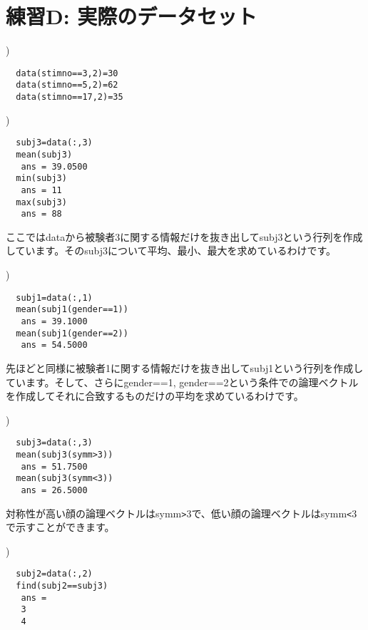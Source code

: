 \documentclass{jsarticle}
\begin{document}
\section{練習D: 実際のデータセット}

)

\begin{verbatim}
  data(stimno==3,2)=30
  data(stimno==5,2)=62
  data(stimno==17,2)=35
\end{verbatim}

\bigskip

)

\begin{verbatim}
  subj3=data(:,3)
  mean(subj3) 
   ans = 39.0500
  min(subj3) 
   ans = 11
  max(subj3) 
   ans = 88
\end{verbatim}

\begin{screen}
ここではdataから被験者3に関する情報だけを抜き出してsubj3という行列を作成しています。そのsubj3について平均、最小、最大を求めているわけです。
\end{screen}

\bigskip

)
\begin{verbatim}
  subj1=data(:,1)
  mean(subj1(gender==1))
   ans = 39.1000
  mean(subj1(gender==2))
   ans = 54.5000
\end{verbatim}

\begin{screen}
先ほどと同様に被験者1に関する情報だけを抜き出してsubj1という行列を作成しています。そして、さらにgender==1, gender==2という条件での論理ベクトルを作成してそれに合致するものだけの平均を求めているわけです。
\end{screen}

\bigskip

)
\begin{verbatim}
  subj3=data(:,3)
  mean(subj3(symm>3))
   ans = 51.7500
  mean(subj3(symm<3))
   ans = 26.5000
\end{verbatim}

\begin{screen}
対称性が高い顔の論理ベクトルはsymm\verb|>|3で、低い顔の論理ベクトルはsymm\verb|<|3で示すことができます。
\end{screen}

\bigskip

)
\begin{verbatim}
  subj2=data(:,2)
  find(subj2==subj3)
   ans = 
   3
   4
\end{verbatim}
\end{document}
